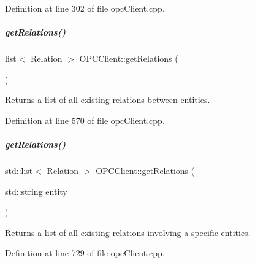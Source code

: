 Definition at line 302 of file opc\+Client.\+cpp.

\mbox{\label{group__icubclient__clients_a10a9d5b6006fce9a32c82f19ae03ae74}} 
\subparagraph{\texorpdfstring{get\+Relations()}{getRelations()}\hspace{0.1cm}{\footnotesize\ttfamily [1/3]}}
{\footnotesize\ttfamily list$<$ \hyperlink{group__icubclient__representations_classicubclient_1_1Relation}{Relation} $>$ O\+P\+C\+Client\+::get\+Relations (\begin{DoxyParamCaption}{ }\end{DoxyParamCaption})}



Returns a list of all existing relations between entities. 



Definition at line 570 of file opc\+Client.\+cpp.

\mbox{\label{group__icubclient__clients_a1a3ea6255bc9da44f281fa767801587e}} 
\subparagraph{\texorpdfstring{get\+Relations()}{getRelations()}\hspace{0.1cm}{\footnotesize\ttfamily [2/3]}}
{\footnotesize\ttfamily std\+::list$<$ \hyperlink{group__icubclient__representations_classicubclient_1_1Relation}{Relation} $>$ O\+P\+C\+Client\+::get\+Relations (\begin{DoxyParamCaption}\item[{std\+::string}]{entity }\end{DoxyParamCaption})}



Returns a list of all existing relations involving a specific entities. 



Definition at line 729 of file opc\+Client.\+cpp.

